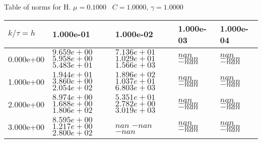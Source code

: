 \begin{center}
Table of norms for H. $\mu = 0.1000$ \, $C = 1.0000$, $\gamma = 1.0000$
  
\begin{tabular}{|p{1in}|p{1in}|p{1in}|p{1in}|p{1in}|} \hline
$k / \tau = h$ &1.000e-01 &1.000e-02 &1.000e-03 &1.000e-04 \\ \hline 
0.000e+00 & $9.659e+00$  $5.958e+00$  $5.483e+01$  & $7.136e+01$  $1.029e+01$  $1.566e+03$  & $nan$  $-nan$  $-nan$  & $nan$  $-nan$  $-nan$  \\ \hline 
1.000e+00 & $1.944e+01$  $3.860e+00$  $2.054e+02$  & $1.896e+02$  $1.037e+01$  $6.803e+03$  & $nan$  $-nan$  $-nan$  & $nan$  $-nan$  $-nan$  \\ \hline 
2.000e+00 & $8.974e+00$  $1.688e+00$  $1.806e+02$  & $5.351e+01$  $2.782e+00$  $3.019e+03$  & $nan$  $-nan$  $-nan$  & $nan$  $-nan$  $-nan$  \\ \hline 
3.000e+00 & $8.595e+00$  $1.217e+00$  $2.800e+02$  & $nan$  $-nan$  $-nan$  & $nan$  $-nan$  $-nan$  & $nan$  $-nan$  $-nan$  \\ \hline 

\end{tabular}\\[20pt]
\end{center}

